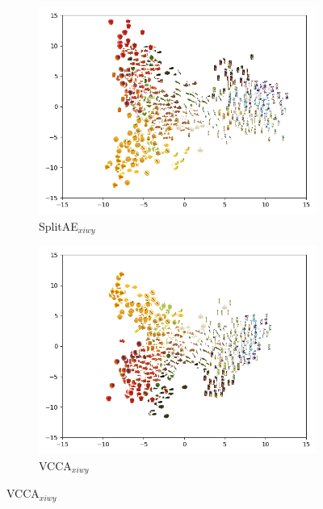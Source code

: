
\begin{figure}[t]
     \centering
     \begin{subfigure}[b]{0.45\textwidth}
         \centering
         \includegraphics[width=\textwidth]{figures_and_tables/latent_space_visualizations/splitae_vcca_comparison/pca_latents_splitae_xiwy_seed2.png}
         \caption{SplitAE$_{xiwy}$}
         \label{fig:splitae_xiwy_comparison}
     \end{subfigure}
     \begin{subfigure}[b]{0.45\textwidth}
         \centering
         \includegraphics[width=\textwidth]{figures_and_tables/latent_space_visualizations/splitae_vcca_comparison/pca_latents_vcca_xiwy_seed2.png}
         \caption{VCCA$_{xiwy}$}

\end{subfigure}
\end{figure}
